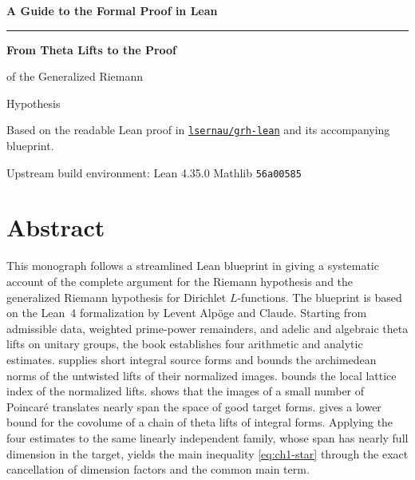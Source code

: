 \begin{titlepage}
\thispagestyle{empty}
\sffamily
\setlength{\parindent}{0pt}
\vspace*{0.03\textheight}

{\large\bfseries\color{DefinitionInk} A Guide to the Formal Proof in Lean\par}
\vspace{0.55em}
{\color{DefinitionInk}\rule{27mm}{1pt}\par}
\vspace{1.35em}

{\fontsize{29pt}{36pt}\linespread{1.06}\selectfont\bfseries\color{OxfordNavy}
 From Theta Lifts to the Proof\par
 of the Generalized Riemann\par
 Hypothesis\par}
\vspace{1.65em}

{\normalsize\rmfamily\color{SlateInk}
 Based on the readable Lean proof in
 \href{https://github.com/lsernau/grh-lean}{\texttt{lsernau/grh-lean}}
 and its accompanying blueprint.\par}
\vspace{0.35em}
{\small\sffamily\color{SlateInk!75}
 Upstream build environment: Lean 4.35.0\quad\textperiodcentered\quad
 Mathlib \texttt{56a00585}\par}

\vfill
{\graphicspath{{../figures/}}%
 \noindent\par}
\end{titlepage}


\chapter*{Abstract}

This monograph follows a streamlined Lean blueprint in giving a systematic account of the complete argument for the Riemann hypothesis and the generalized Riemann hypothesis for Dirichlet $L$-functions. The blueprint is based on the Lean~4 formalization by Levent Alpöge and Claude. Starting from admissible data, weighted prime-power remainders, and adelic and algebraic theta lifts on unitary groups, the book establishes four arithmetic and analytic estimates.  supplies short integral source forms and bounds the archimedean norms of the untwisted lifts of their normalized images.  bounds the local lattice index of the normalized lifts.  shows that the images of a small number of Poincaré translates nearly span the space of good target forms.  gives a lower bound for the covolume of a chain of theta lifts of integral forms. Applying the four estimates to the same linearly independent family, whose span has nearly full dimension in the target, yields the main inequality \eqref{eq:ch1-star} through the exact cancellation of dimension factors and the common main term.

